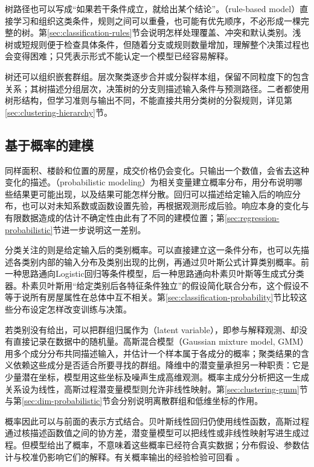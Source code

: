 树路径也可以写成“如果若干条件成立，就给出某个结论”。（rule-based model）直接学习和组织这类条件，规则之间可以重叠，也可能有优先顺序，不必形成一棵完整的树。第\ref{sec:classification-rules}节会说明怎样处理覆盖、冲突和默认类别。浅树或短规则便于检查具体条件，但随着分支或规则数量增加，理解整个决策过程也会变得困难；只凭表示形式不能认定一个模型已经容易解释。

树还可以组织嵌套群组。层次聚类逐步合并或分裂样本组，保留不同粒度下的包含关系；其树描述分组层次，决策树的分支则描述输入条件与预测路径。二者都使用树形结构，但学习准则与输出不同，不能直接共用分类树的分裂规则，详见第\ref{sec:clustering-hierarchy}节。

\subsection{基于概率的建模}
\label{sec:classic-overview-probabilistic}

同样面积、楼龄和位置的房屋，成交价格仍会变化。只输出一个数值，会省去这种变化的描述。（probabilistic modeling）为相关变量建立概率分布，用分布说明哪些结果更可能出现，以及结果可能怎样分散。回归可以描述给定输入后的响应分布，也可以对未知系数或函数设置先验，再根据观测形成后验。响应本身的变化与有限数据造成的估计不确定性由此有了不同的建模位置；第\ref{sec:regression-probabilistic}节进一步说明这一差别。

分类关注的则是给定输入后的类别概率。可以直接建立这一条件分布，也可以先描述各类别内部的输入分布及类别出现的比例，再通过贝叶斯公式计算类别概率。前一种思路通向Logistic回归等条件模型，后一种思路通向朴素贝叶斯等生成式分类器。朴素贝叶斯用“给定类别后各特征条件独立”的假设简化联合分布，这个假设不等于说所有房屋属性在总体中互不相关。第\ref{sec:classification-probability}节比较这些分布设定怎样改变训练与决策。

若类别没有给出，可以把群组归属作为（latent variable），即参与解释观测、却没有直接记录在数据中的随机量。高斯混合模型（Gaussian mixture model, GMM）用多个成分分布共同描述输入，并估计一个样本属于各成分的概率；聚类结果的含义依赖这些成分是否适合所要寻找的群组。降维中的潜变量承担另一种职责：它是少量潜在坐标，模型用这些坐标及噪声生成高维观测。概率主成分分析把这一生成关系设为线性，高斯过程潜变量模型则允许非线性映射。第\ref{sec:clustering-gmm}节与第\ref{sec:dim-probabilistic}节会分别说明离散群组和低维坐标的作用。

概率因此可以与前面的表示方式结合。贝叶斯线性回归仍使用线性函数，高斯过程通过核描述函数值之间的协方差，潜变量模型可以把线性或非线性映射写进生成过程。但模型给出了概率，不意味着这些概率已经符合真实数据；分布假设、参数估计与校准仍影响它们的解释。有关概率输出的经验检验可回看
。

